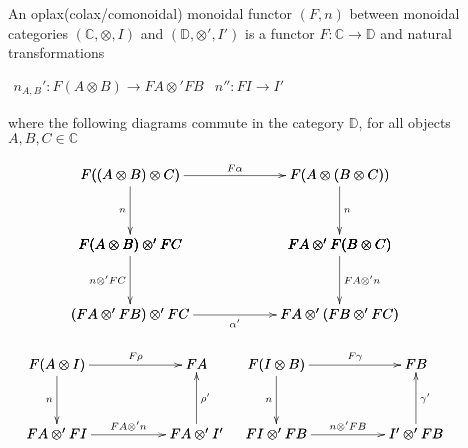 \begin{definition}
\label{def:oplax_monoidal_functor}
    An oplax(colax/comonoidal) monoidal functor $(F,n)$ between monoidal categories $(\mathbb{C}, \otimes, I)$ and
    $(\mathbb{D}, \otimes ', I')$ is a functor $F:\mathbb{C} \rightarrow \mathbb{D}$ and natural transformations
    \begin{center}
        \begin{math}
            \begin{array}{lr}
                n_{A,B}' : F(A \otimes B) \rightarrow FA \otimes ' FB & n'' : FI \rightarrow I'
            \end{array}
        \end{math}
    \end{center}
    where the following diagrams commute in the category $\mathbb{D}$, for all objects $A,B,C \in \mathbb{C}$
    \begin{center}
        \begin{math}
            \begin{array}{c}
                \bfig
                \square|alrr|/->`->`->`/<1500,500>[
                    F((A \otimes B)\otimes C)`
                    F(A \otimes (B \otimes C))`
                    F(A \otimes B) \otimes ' FC`
                    FA \otimes ' F(B \otimes C);
                    F \alpha`
                    n`
                    n`
                ]
                \square(0,-500)|alrb|/`->`->`->/<1500,500>[
                    F(A \otimes B) \otimes ' FC`
                    FA \otimes ' F(B \otimes C)`
                    (FA \otimes ' FB) \otimes ' FC`
                    FA \otimes ' (FB \otimes ' FC);
                    `
                    n \otimes ' FC`
                    FA \otimes ' n`
                    \alpha '
                ]
                \efig
                \\\\
                \begin{array}{lr}
                    \bfig
                        \square|alra|/->`->`<-`->/<1000,500>[
                            F(A \otimes I)`
                            FA`
                            FA \otimes ' FI`
                            FA \otimes ' I';
                            F\rho`
                            n`
                            \rho '`
                            FA \otimes ' n
                        ]
                    \efig
                    &
                    \bfig
                        \square|alra|/->`->`<-`->/<1000,500>[
                            F(I \otimes B)`
                            FB`
                            FI \otimes ' FB`
                            I' \otimes ' FB;
                            F\gamma`
                            n`
                            \gamma '`
                            n \otimes ' FB
                        ]
                    \efig
                \end{array}
            \end{array}
        \end{math}
    \end{center}
    \cite{mellies2009}
\end{definition}




